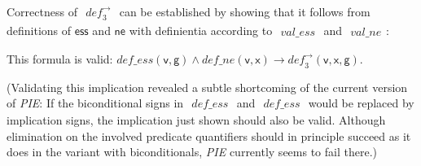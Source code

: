 \documentclass[a4paper]{article}
\newcommand{\f}[1]{\mathsf{#1}}
\newcommand{\imp}{\rightarrow}
\newcommand{\pplmacro}[1]{\mathit{#1}}
\newcommand{\pplIsValid}[1]{\noindent This formula is valid: $#1$\par}
\newcounter{def}
\newcommand{\name}[1]{\textit{#1}}
\begin{document}
  \noindent Correctness of $\begin{array}{l}
\pplmacro{def_{3}^{\rightarrow}}
\end{array}
$ can be established by
  showing that it follows from definitions of $\f{ess}$ and $\f{ne}$ with
  definientia according to $\begin{array}{l}
\pplmacro{val\_ess}
\end{array}
$ and $\begin{array}{l}
\pplmacro{val\_ne}
\end{array}
$:

  \smallskip
\pplIsValid{\pplmacro{def\_ess}(\mathsf{v},\mathsf{g}) \land  \pplmacro{def\_ne}(\mathsf{v},\mathsf{x}) \imp  \pplmacro{def_{3}^{\rightarrow}}(\mathsf{v},\mathsf{x},\mathsf{g}).}
%
%
  \medskip \noindent (Validating this implication revealed a subtle
  shortcoming of the current version of \name{PIE}: If the biconditional signs
  in $\begin{array}{l}
\pplmacro{def\_ess}
\end{array}
$ and $\begin{array}{l}
\pplmacro{def\_ess}
\end{array}
$ would be replaced by
  implication signs, the implication just shown should also be valid. Although
  elimination on the involved predicate quantifiers should in principle
  succeed as it does in the variant with biconditionals, \name{PIE} currently
  seems to fail there.)

  \medskip
  
\end{document}
